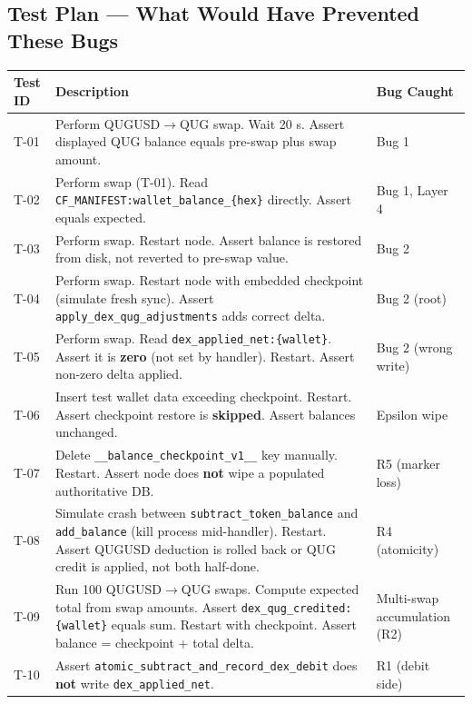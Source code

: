 \documentclass[11pt,a4paper]{article}
\begin{document}
\subsection{Test Plan — What Would Have Prevented These Bugs}

\begin{center}
\begin{tabularx}{\textwidth}{p{3.2cm}Xp{2.2cm}}
\toprule
\textbf{Test ID} & \textbf{Description} & \textbf{Bug Caught} \\
\midrule
T-01 & Perform QUGUSD$\to$QUG swap. Wait 20 s. Assert displayed QUG balance equals pre-swap plus swap amount. &
  Bug 1 \\
T-02 & Perform swap (T-01). Read \texttt{CF\_MANIFEST:wallet\_balance\_\{hex\}} directly. Assert equals expected. &
  Bug 1, Layer 4 \\
T-03 & Perform swap. Restart node. Assert balance is restored from disk, not reverted to pre-swap value. &
  Bug 2 \\
T-04 & Perform swap. Restart node with embedded checkpoint (simulate fresh sync). Assert \texttt{apply\_dex\_qug\_adjustments} adds correct delta. &
  Bug 2 (root) \\
T-05 & Perform swap. Read \texttt{dex\_applied\_net:\{wallet\}}. Assert it is \textbf{zero} (not set by handler). Restart. Assert non-zero delta applied. &
  Bug 2 (wrong write) \\
T-06 & Insert test wallet data exceeding checkpoint. Restart. Assert checkpoint restore is \textbf{skipped}. Assert balances unchanged. &
  Epsilon wipe \\
T-07 & Delete \texttt{\_\_balance\_checkpoint\_v1\_\_} key manually. Restart. Assert node does \textbf{not} wipe a populated authoritative DB. &
  R5 (marker loss) \\
T-08 & Simulate crash between \texttt{subtract\_token\_balance} and \texttt{add\_balance} (kill process mid-handler). Restart. Assert QUGUSD deduction is rolled back or QUG credit is applied, not both half-done. &
  R4 (atomicity) \\
T-09 & Run 100 QUGUSD$\to$QUG swaps. Compute expected total from swap amounts. Assert \texttt{dex\_qug\_credited:\{wallet\}} equals sum. Restart with checkpoint. Assert balance = checkpoint + total delta. &
  Multi-swap accumulation (R2) \\
T-10 & Assert \texttt{atomic\_subtract\_and\_record\_dex\_debit} does \textbf{not} write \texttt{dex\_applied\_net}. &
  R1 (debit side) \\
\bottomrule
\end{tabularx}
\end{center}
\end{document}
